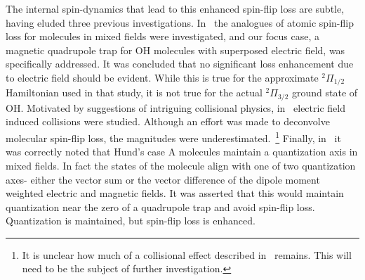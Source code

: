 \documentclass[%
 reprint,
groupedaddress,
 amsmath,amssymb,
 aps,
prl,
]{revtex4-1}
\begin{document}
The internal spin-dynamics that lead to this enhanced spin-flip loss are subtle, having eluded three previous investigations. In~\cite{Lara2008} the analogues of atomic spin-flip loss for molecules in mixed fields were investigated, and our focus case, a magnetic quadrupole trap for OH molecules with superposed electric field, was specifically addressed. It was concluded that no significant loss enhancement due to electric field should be evident. While this is true for the approximate $^2\Pi_{1/2}$ Hamiltonian used in that study, it is not true for the actual $^2\Pi_{3/2}$ ground state of OH. Motivated by suggestions of intriguing collisional physics, in~\cite{Stuhl2013} electric field induced collisions were studied. Although an effort was made to deconvolve molecular spin-flip loss, the magnitudes were underestimated.~\footnote{It is unclear how much of a collisional effect described in~\cite{Stuhl2013} remains. This will need to be the subject of further investigation.} Finally, in~\cite{Bohn2013} it was correctly noted that Hund's case A molecules maintain a quantization axis in mixed fields. In fact the states of the molecule align with one of two quantization axes- either the vector sum or the vector difference of the dipole moment weighted electric and magnetic fields. It was asserted that this would maintain quantization near the zero of a quadrupole trap and avoid spin-flip loss. Quantization is maintained, but spin-flip loss is enhanced.
\end{document}
